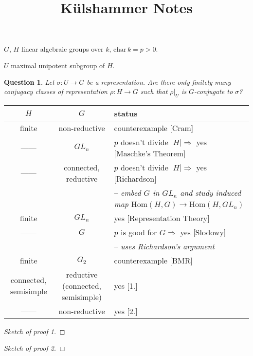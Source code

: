\documentclass[12pt, a4paper]{amsart}
\newcommand*{\ditto}{---\textquotedbl---}
\newtheorem{qn}[equation]{Question}
\begin{document}
\title{K\"ulshammer Notes}
\maketitle

$G$, $H$ linear algebraic groups over $k$, $\mathrm{char}\,k = p>0$.

$U$ maximal unipotent subgroup of $H$.

\begin{qn}
	Let $\sigma\colon U\rightarrow G$ be a representation.  Are there only finitely many conjugacy classes of representation $\rho\colon H\rightarrow G$ such that $\rho|_U$ is $G$-conjugate to $\sigma$?
\end{qn}

\begin{tabular}{c|c|l}
	$H$ & $G$ & status \\
	\hline
	finite & non-reductive & counterexample [Cram] \\
	\ditto & $GL_n$ & $p$ doesn't divide $|H| \Rightarrow$ yes [Maschke's Theorem] \\
	\ditto & connected, reductive & $p$ doesn't divide $|H| \Rightarrow$ yes [Richardson] \\
	         &                & -- \emph{embed $G$ in $GL_n$ and study induced map $\mathrm{Hom}(H, G)\rightarrow \mathrm{Hom}(H, GL_n)$} \\
	finite & $GL_n$ & yes [Representation Theory] \\
	\ditto & $G$ & $p$ is good for $G \Rightarrow $ yes [Slodowy] \\
	         &         & -- \emph{uses Richardson's argument} \\
	finite & $G_2$ & counterexample [BMR] \\
	connected, semisimple & reductive (connected, semisimple) & yes [1.] \\
	\ditto & non-reductive & yes [2.]
\end{tabular}

\begin{proof} [Sketch of proof 1]
\end{proof}

\begin{proof} [Sketch of proof 2]
\end{proof}
\end{document}
